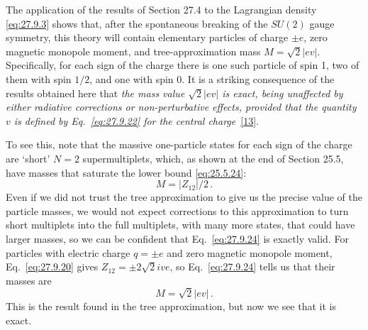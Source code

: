 The application of the results of Section 27.4 to the Lagrangian density
\eqref{eq:27.9.3} shows that, after the spontaneous breaking of the \(SU(2)\)
gauge symmetry, this theory will contain elementary particles of charge
\(\mathord{\pm}e\), zero magnetic monopole moment, and tree-approximation mass
\(M=\sqrt{2}|ev|\). Specifically, for each sign of the charge there is one
such particle of spin 1, two of them with spin \(1/2\), and one with spin 0.
It is a striking consequence of the results obtained here that \emph{the mass
value \(\sqrt{2}|ev|\) is exact, being unaffected by either radiative
corrections or non-perturbative effects, provided that the quantity \(v\) is
defined by Eq.~\eqref{eq:27.9.22} for the central
charge}~\hyperref[ch27-ref-13]{[13]}.

To see this, note that the massive one-particle states for each sign of the
charge are `short' \(N=2\) supermultiplets, which, as shown at the end of
Section 25.5, have masses that saturate the lower bound \eqref{eq:25.5.24}:
\begin{equation}
  M=|Z_{12}|/2\,.
  \tag{27.9.24}\label{eq:27.9.24}
\end{equation}
Even if we did not trust the tree approximation to give us the precise value
of the particle masses, we would not expect corrections to this approximation
to turn short multiplets into the full multiplets, with many more states, that
could have larger masses, so we can be confident that Eq.~\eqref{eq:27.9.24}
is exactly valid. For particles with electric charge \(q=\mathord{\pm}e\) and
zero magnetic monopole moment, Eq.~\eqref{eq:27.9.20} gives
\(Z_{12}=\mathord{\pm}2\sqrt{2}ive\), so Eq.~\eqref{eq:27.9.24} tells us that
their masses are
\begin{equation}
  M=\sqrt{2}|ev|\,.
  \tag{27.9.25}\label{eq:27.9.25}
\end{equation}
This is the result found in the tree approximation, but now we see that it is
exact.

